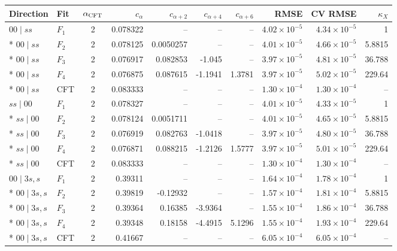 \begin{longtable}{llcrrrrrrr}\toprule
Direction & Fit & $\alpha_{\rm CFT}$ & $c_\alpha$ & $c_{\alpha+2}$ & $c_{\alpha+4}$ & $c_{\alpha+6}$ & RMSE & CV RMSE & $\kappa_X$\\\midrule\endhead
$00\mid ss$ & $F_1$ & 2 & 0.078322 & -- & -- & -- & $4.02\!\times\!10^{-5}$ & $4.34\!\times\!10^{-5}$ & 1 \\*
$00\mid ss$ & $F_2$ & 2 & 0.078125 & 0.0050257 & -- & -- & $4.01\!\times\!10^{-5}$ & $4.66\!\times\!10^{-5}$ & 5.8815 \\*
$00\mid ss$ & $F_3$ & 2 & 0.076917 & 0.082853 & -1.045 & -- & $3.97\!\times\!10^{-5}$ & $4.81\!\times\!10^{-5}$ & 36.788 \\*
$00\mid ss$ & $F_4$ & 2 & 0.076875 & 0.087615 & -1.1941 & 1.3781 & $3.97\!\times\!10^{-5}$ & $5.02\!\times\!10^{-5}$ & 229.64 \\*
$00\mid ss$ & CFT & 2 & 0.083333 & -- & -- & -- & $1.30\!\times\!10^{-4}$ & $1.30\!\times\!10^{-4}$ & -- \\
\addlinespace[3pt]
$ss\mid 00$ & $F_1$ & 2 & 0.078327 & -- & -- & -- & $4.01\!\times\!10^{-5}$ & $4.33\!\times\!10^{-5}$ & 1 \\*
$ss\mid 00$ & $F_2$ & 2 & 0.078124 & 0.0051711 & -- & -- & $4.01\!\times\!10^{-5}$ & $4.65\!\times\!10^{-5}$ & 5.8815 \\*
$ss\mid 00$ & $F_3$ & 2 & 0.076919 & 0.082763 & -1.0418 & -- & $3.97\!\times\!10^{-5}$ & $4.80\!\times\!10^{-5}$ & 36.788 \\*
$ss\mid 00$ & $F_4$ & 2 & 0.076871 & 0.088215 & -1.2126 & 1.5777 & $3.97\!\times\!10^{-5}$ & $5.01\!\times\!10^{-5}$ & 229.64 \\*
$ss\mid 00$ & CFT & 2 & 0.083333 & -- & -- & -- & $1.30\!\times\!10^{-4}$ & $1.30\!\times\!10^{-4}$ & -- \\
\addlinespace[3pt]
$00\mid 3s,s$ & $F_1$ & 2 & 0.39311 & -- & -- & -- & $1.64\!\times\!10^{-4}$ & $1.78\!\times\!10^{-4}$ & 1 \\*
$00\mid 3s,s$ & $F_2$ & 2 & 0.39819 & -0.12932 & -- & -- & $1.57\!\times\!10^{-4}$ & $1.81\!\times\!10^{-4}$ & 5.8815 \\*
$00\mid 3s,s$ & $F_3$ & 2 & 0.39364 & 0.16385 & -3.9364 & -- & $1.55\!\times\!10^{-4}$ & $1.86\!\times\!10^{-4}$ & 36.788 \\*
$00\mid 3s,s$ & $F_4$ & 2 & 0.39348 & 0.18158 & -4.4915 & 5.1296 & $1.55\!\times\!10^{-4}$ & $1.93\!\times\!10^{-4}$ & 229.64 \\*
$00\mid 3s,s$ & CFT & 2 & 0.41667 & -- & -- & -- & $6.05\!\times\!10^{-4}$ & $6.05\!\times\!10^{-4}$ & -- \\

\end{longtable}

